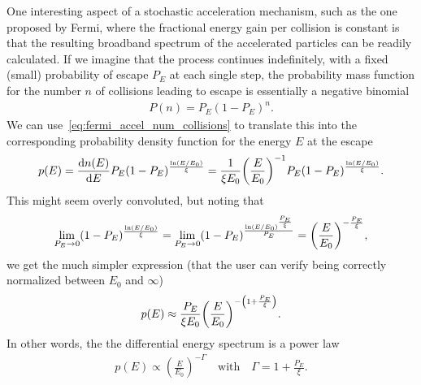 One interesting aspect of a stochastic acceleration mechanism, such as the one proposed
by Fermi, where the fractional energy gain per collision is constant is that the
resulting broadband spectrum of the accelerated particles can be readily calculated.
If we imagine that the process continues indefinitely, with a fixed (small) probability
of escape $P_E$ at each single step, the probability mass function for the number
$n$ of collisions leading to escape is essentially a negative binomial
\begin{align}\label{eq:num_collisions_pmf}
 P(n) = P_E(1 - P_E)^n.
\end{align}
We can use~\eqref{eq:fermi_accel_num_collisions} to translate this into the corresponding
probability density function for the energy $E$ at the escape
\begin{align*}
  p(E) = \dv{n(E)}{E} P_E (1 - P_E)^{\frac{\ln(E / E_0)}{\xi}} =
  \frac{1}{\xi E_0} \qty(\frac{E}{E_0})^{-1} P_E (1 - P_E)^{\frac{\ln(E / E_0)}{\xi}}.
\end{align*}
This might seem overly convoluted, but noting that
\begin{align*}
  \lim_{P_E \rightarrow 0} (1 - P_E)^{\frac{\ln(E / E_0)}{\xi}} =
  \lim_{P_E \rightarrow 0} (1 - P_E)^{\frac{\ln(E / E_0)^\frac{P_E}{\xi}}{P_E}} =
  \qty(\frac{E}{E_0})^{-\frac{P_E}{\xi}},
\end{align*}
we get the much simpler expression (that the user can verify being correctly normalized
between $E_0$ and $\infty$)
\begin{align*}
  p(E) \approx \frac{P_E}{\xi E_0} \qty(\frac{E}{E_0})^{-\left(1 + \frac{P_E}{\xi}\right)}.
\end{align*}
In other words, the the differential energy spectrum is a power law
\begin{align}
  p(E) \propto \left( \frac{E}{E_0} \right)^{-\Gamma}
  \quad\text{with}\quad
  \Gamma = 1 + \frac{P_E}{\xi}.
\end{align}

